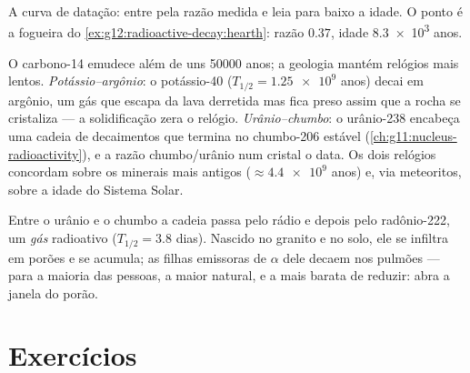 \begin{omfigure}

{\small A curva de datação: entre pela razão medida e leia para baixo a idade. O ponto é
a fogueira do \cref{ex:g12:radioactive-decay:hearth}: razão $0.37$, idade
\num{8.3e3} anos.}
\end{omfigure}

\begin{example}\label{ex:g12:radioactive-decay:rocks}
O carbono-14 emudece além de uns \num{50000} anos; a geologia mantém relógios mais
lentos. \emph{Potássio--argônio}: o potássio-40 ($T_{1/2} = \num{1.25e9}$ anos) decai em
argônio, um gás que escapa da lava derretida mas fica preso assim que a rocha se
cristaliza --- a solidificação zera o relógio. \emph{Urânio--chumbo}: o urânio-238
encabeça uma cadeia de decaimentos que termina no chumbo-206 estável
(\cref{ch:g11:nucleus-radioactivity}), e a razão chumbo/urânio num cristal o data. Os
dois relógios concordam sobre os minerais mais antigos ($\approx \num{4.4e9}$ anos) e,
via meteoritos, sobre a idade do Sistema Solar.
\end{example}

\begin{remark}\label{rem:g12:radioactive-decay:radon}
Entre o urânio e o chumbo a cadeia passa pelo rádio e depois pelo radônio-222, um
\emph{gás} radioativo ($T_{1/2} = 3.8$ dias). Nascido no granito e no solo, ele se
infiltra em porões e se acumula; as filhas emissoras de $\alpha$ dele decaem nos pulmões
--- para a maioria das pessoas, a maior  natural, e a mais barata de reduzir: abra a
janela do porão.
\end{remark}

\section{Exercícios}

